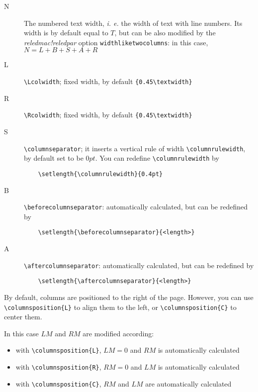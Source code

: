 \documentclass[11pt,a4paper]{article}
\newcommand{\package}[1]{\emph{#1}}
\begin{document}
\begin{description}	
	\item[N] The numbered text width, \emph{i. e.} the width of text with line numbers. Its width is by default equal to $T$, but can be also modified by the \package{reledmac!}\package{reledpar} option \verb!widthliketwocolumns!: in this case, $N=L+B+S+A+R$
	
	\item[L] \verb!\Lcolwidth!; fixed width, by default \verb!{0.45\textwidth}!
	
	\item[R] \verb!\Rcolwidth!; fixed width, by default \verb!{0.45\textwidth}!
	
	\item[S] \verb!\columnseparator!; it inserts a vertical rule of width \verb!\columnrulewidth!, by default set to be $0pt$. You can redefine \verb!\columnrulewidth! by
	
\begin{verbatim}
	\setlength{\columnrulewidth}{0.4pt}
\end{verbatim}
	
	\item[B] \verb!\beforecolumnseparator!: automatically calculated, but can be redefined by
	
\begin{verbatim}
	\setlength{\beforecolumnseparator}{<length>}
\end{verbatim}
	
	\item[A] \verb!\aftercolumnseparator!: automatically calculated, but can be redefined by

\begin{verbatim}
	\setlength{\aftercolumnseparator}{<length>}
\end{verbatim}

\end{description}

By default, columns are positioned to the right of the page. However, you can use
\verb!\columnsposition{L}! to align them to the left, or \verb!\columnsposition{C}! to center
them.

In this case $LM$ and $RM$ are modified according:

\begin{itemize}
	\item with \verb!\columnsposition{L}!, $LM=0$ and $RM$ is automatically calculated
	\item with \verb!\columnsposition{R}!, $RM=0$ and $LM$ is automatically calculated
	\item with \verb!\columnsposition{C}!, $RM$ and $LM$ are automatically calculated
\end{itemize}
\end{document}
